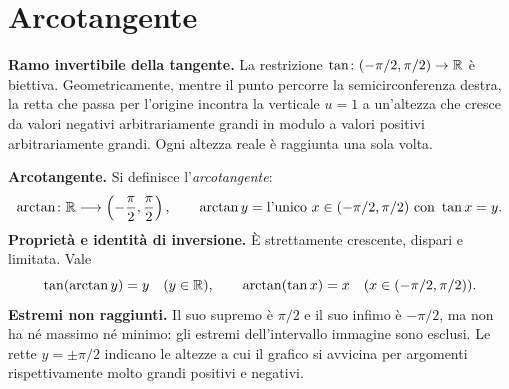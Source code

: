 \begin{schema}
\hspace{.6cm}
\end{schema}

\section{Arcotangente}

\textbf{Ramo invertibile della tangente.} La restrizione $\tan\colon(-\pi/2,\pi/2)\to\mathbb{R}$ è biettiva. Geometricamente, mentre il punto percorre la semicirconferenza destra, la retta che passa per l'origine incontra la verticale $u=1$ a un'altezza che cresce da valori negativi arbitrariamente grandi in modulo a valori positivi arbitrariamente grandi. Ogni altezza reale è raggiunta una sola volta.

\textbf{Arcotangente.} Si definisce l'\emph{arcotangente}:
\[
\arctan\colon\mathbb{R}\longrightarrow\left(-\frac\pi2,\frac\pi2\right),
\qquad \arctan y=\text{l'unico }x\in(-\pi/2,\pi/2)\text{ con }\tan x=y.
\]
\textbf{Proprietà e identità di inversione.} È strettamente crescente, dispari e limitata. Vale
\[
\tan(\arctan y)=y\quad(y\in\mathbb{R}),\qquad
\arctan(\tan x)=x\quad(x\in(-\pi/2,\pi/2)).
\]
\textbf{Estremi non raggiunti.} Il suo supremo è $\pi/2$ e il suo infimo è $-\pi/2$, ma non ha né massimo né minimo: gli estremi dell'intervallo immagine sono esclusi. Le rette $y=\pm\pi/2$ indicano le altezze a cui il grafico si avvicina per argomenti rispettivamente molto grandi positivi e negativi.

